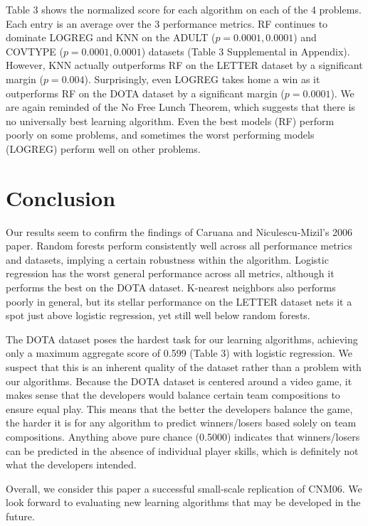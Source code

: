 \documentclass[twoside,11pt]{article}
\begin{document}
Table 3 shows the normalized score for each algorithm on each of the 4 problems. Each entry is an average over the 3 performance metrics. RF continues to dominate LOGREG and KNN on the ADULT ($p = 0.0001, 0.0001$) and COVTYPE ($p = 0.0001, 0.0001$) datasets (Table 3 Supplemental in Appendix). However, KNN actually outperforms RF on the LETTER dataset by a significant margin ($p = 0.004$). Surprisingly, even LOGREG takes home a win as it outperforms RF on the DOTA dataset by a significant margin ($p = 0.0001$). We are again reminded of the No Free Lunch Theorem, which suggests that there is no universally best learning algorithm. Even the best models (RF) perform poorly on some problems, and sometimes the worst performing models (LOGREG) perform well on other problems.

\section{Conclusion}

Our results seem to confirm the findings of Caruana and Niculescu-Mizil’s 2006 paper. Random forests perform consistently well across all performance metrics and datasets, implying a certain robustness within the algorithm. Logistic regression has the worst general performance across all metrics, although it performs the best on the DOTA dataset. K-nearest neighbors also performs poorly in general, but its stellar performance on the LETTER dataset nets it a spot just above logistic regression, yet still well below random forests.

The DOTA dataset poses the hardest task for our learning algorithms, achieving only a maximum aggregate score of 0.599 (Table 3) with logistic regression. We suspect that this is an inherent quality of the dataset rather than a problem with our algorithms. Because the DOTA dataset is centered around a video game, it makes sense that the developers would balance certain team compositions to ensure equal play. This means that the better the developers balance the game, the harder it is for any algorithm to predict winners/losers based solely on team compositions. Anything above pure chance (0.5000) indicates that winners/losers can be predicted in the absence of individual player skills, which is definitely not what the developers intended.

Overall, we consider this paper a successful small-scale replication of CNM06. We look forward to evaluating new learning algorithms that may be developed in the future.
\end{document}
